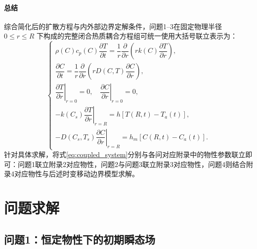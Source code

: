 \documentclass[12pt,a4paper]{ctexart}
\begin{document}
\paragraph{总结}
综合简化后的扩散方程与内外部边界定解条件，问题1--3在固定物理半径 $0\le r\le R$ 下构成的完整闭合热质耦合方程组可统一使用大括号联立表示为：
\begin{equation}
\begin{cases}
\rho(C)c_p(C)\dfrac{\partial T}{\partial t} = \dfrac{1}{r}\dfrac{\partial}{\partial r}\left(rk(C)\dfrac{\partial T}{\partial r}\right),\\[12pt]
\dfrac{\partial C}{\partial t} = \dfrac{1}{r}\dfrac{\partial}{\partial r}\left(rD(C,T)\dfrac{\partial C}{\partial r}\right),\\[12pt]
\left.\dfrac{\partial T}{\partial r}\right|_{r=0} = 0,\quad \left.\dfrac{\partial C}{\partial r}\right|_{r=0} = 0,\\[12pt]
-k(C_s)\left.\dfrac{\partial T}{\partial r}\right|_{r=R} = h\left[T(R,t)-T_a(t)\right],\\[12pt]
-D(C_s,T_s)\left.\dfrac{\partial C}{\partial r}\right|_{r=R} = h_m\left[C(R,t)-C_a(t)\right].
\end{cases}\label{eq:coupled_system}
\end{equation}
针对具体求解，将式\eqref{eq:coupled_system}分别与各问对应附录中的物性参数联立即可：问题1联立附录2对应物性，问题2与问题3联立附录3对应物性，问题4则结合附录4对应物性与后述时变移动边界模型求解。

\section{问题求解}

\subsection{问题1：恒定物性下的初期瞬态场}
\end{document}
